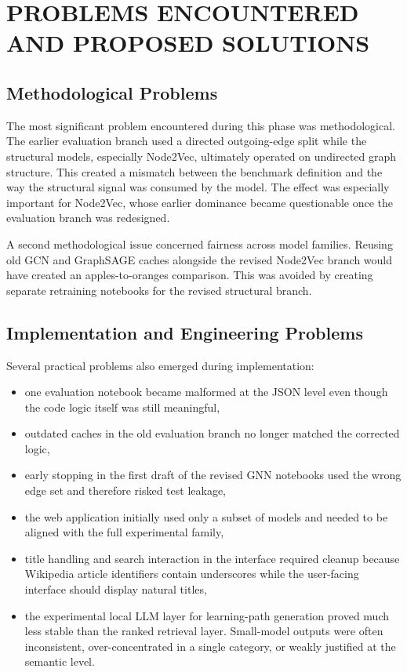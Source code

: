 \chapter{PROBLEMS ENCOUNTERED AND PROPOSED SOLUTIONS}
\thispagestyle{empty}

\section{Methodological Problems}

The most significant problem encountered during this phase was methodological.
The earlier evaluation branch used a directed outgoing-edge split while the
structural models, especially Node2Vec, ultimately operated on undirected graph
structure. This created a mismatch between the benchmark definition and the way
the structural signal was consumed by the model. The effect was especially
important for Node2Vec, whose earlier dominance became questionable once the
evaluation branch was redesigned.

A second methodological issue concerned fairness across model families. Reusing
old GCN and GraphSAGE caches alongside the revised Node2Vec branch would have
created an apples-to-oranges comparison. This was avoided by creating separate
retraining notebooks for the revised structural branch.

\section{Implementation and Engineering Problems}

Several practical problems also emerged during implementation:
\begin{itemize}
    \item one evaluation notebook became malformed at the JSON level even though
    the code logic itself was still meaningful,
    \item outdated caches in the old evaluation branch no longer matched the
    corrected logic,
    \item early stopping in the first draft of the revised GNN notebooks used
    the wrong edge set and therefore risked test leakage,
    \item the web application initially used only a subset of models and needed
    to be aligned with the full experimental family,
    \item title handling and search interaction in the interface required
    cleanup because Wikipedia article identifiers contain underscores while the
    user-facing interface should display natural titles,
    \item the experimental local LLM layer for learning-path generation proved
    much less stable than the ranked retrieval layer. Small-model outputs were
    often inconsistent, over-concentrated in a single category, or weakly
    justified at the semantic level.
\end{itemize}

